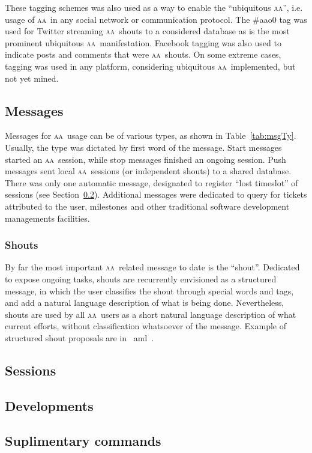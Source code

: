 \documentclass[a4paper, 11pt]{article} %
\newcommand{\aab}{\textsc{aa}}
\begin{document}
These tagging schemes was also used as a way to enable the ``ubiquitous \aab'', i.e. usage of \aab\ in any social network or communication protocol. The \#aao0 tag was used for Twitter streaming \aab\ shouts to a considered database as is the most prominent ubiquitous \aab\ manifestation. Facebook tagging was also used to indicate posts and comments that were \aab\ shouts. On some extreme cases, tagging was used in any platform, considering ubiquitous \aab\ implemented, but not yet mined.

\subsection{Messages}\label{sec:usesh}
Messages for \aab\ usage can be of various types, as shown in Table~\ref{tab:msgTy}. Usually, the type was dictated by first word of the message. Start messages started an \aab\ session, while stop messages finished an ongoing session. Push messages sent local \aab\ sessions (or independent shouts) to a shared database. There was only one automatic message, designated to register ``lost timeslot'' of sessions (see Section~\ref{sec:usess}). Additional messages were dedicated to query for tickets attributed to the user, milestones and other traditional software development managements facilities.

\subsubsection{Shouts}
By far the most important \aab\ related message to date is the ``shout''. Dedicated to expose ongoing tasks, shouts are recurrently envisioned as a structured message, in which the user classifies the shout through special words and tags, and add a natural language description of what is being done. Nevertheless, shouts are used by all \aab\ users as a short natural language description of what current efforts, without classification whatsoever of the message. Example of structured shout proposals are in~\cite{aaWiki} and~\cite{aaREADME}.

\subsection{Sessions}\label{sec:usess}
\subsection{Developments}\label{sec:usedev}
\subsection{Suplimentary commands}\label{sec:usesc}
\end{document}

